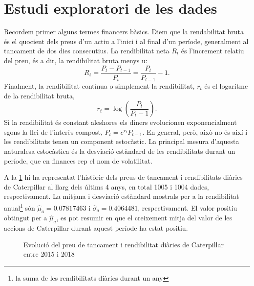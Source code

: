 \documentclass{article}
\numberwithin{table}{section}
\numberwithin{figure}{section}
\numberwithin{equation}{section}
\begin{document}
\section{Estudi exploratori de les dades}
Recordem primer alguns termes financers bàsics. Diem que la rendabilitat bruta és el quocient dels preus d'un actiu a l'inici i al final d'un període, generalment al tancament de dos dies consecutius. La rendibilitat neta \( R_t \) és l'increment relatiu del preu, és a dir, la rendibilitat bruta menys u:
\begin{equation*}
	R_t = \frac{P_t - P_{t-1}}{P_t} = \frac{P_t}{P_{t-1}} - 1.
\end{equation*}
Finalment, la rendibilitat contínua o simplement la rendibilitat, \( r_t \) és el logaritme de la rendibilitat bruta,
\begin{equation} \label{eq:rend}
	r_t = \log{\left(\frac{P_t}{P_t-1}\right)}.
\end{equation}
Si la rendibilitat és constant aleshores els diners evolucionen exponencialment sgons la llei de l'interès compost, \( P_t = e^{r_t}P_{t-1} \). En general, però, això no és així i les rendibilitats tenen un component estocàstic. La principal mesura d'aquesta naturalesa estocàstica és la desviació estàndard de les rendibilitats durant un període, que en finances rep el nom de volatilitat.

A la \cref{fig:serie preus} hi ha representat l'històric dels preus de tancament i rendibilitats diàries de Caterpillar al llarg dels últims 4 anys, en total 1005 i 1004 dades, respectivament. La mitjana i desviació estàndard mostrals per a la rendibilitat anual\footnote{la suma de les rendibilitats diàries durant un any} són $\hat{\mu}_a=\num{0.07817463}$ i $\hat{\sigma}_a=\num{0.4064481}$, respectivament. El valor positiu obtingut per a $\hat{\mu}_a$, es pot resumir en que el creixement mitja del valor de les accions de Caterpillar durant aquest període ha estat positiu.
\begin{figure}[htb]
	\centering \sffamily \small
	
	\caption{Evolució del preu de tancament i rendibilitat diàries de Caterpillar entre 2015 i 2018}
	\label{fig:serie preus}
\end{figure}
\end{document}
